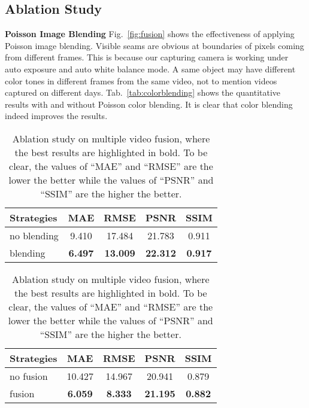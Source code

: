 \documentclass[runningheads]{llncs}
\begin{document}
\subsection{Ablation Study}

\textbf{Poisson Image Blending} Fig.~\ref{fig:fusion} shows the effectiveness of applying Poisson image blending. Visible seams are obvious at boundaries of pixels coming from different frames. This is because our capturing camera is working under auto exposure and auto white balance mode. A same object may have different color tones in different frames from the same video, not to mention videos captured on different days. Tab.~\ref{tab:colorblending} shows the quantitative results with and without Poisson color blending. It is clear that color blending indeed improves the results.

\begin{table}[]
\begin{minipage}[t]{.48\textwidth}
\centering
{
\begin{tabular}{ l c c c c }
\hline
  Strategies   & MAE     & RMSE            & PSNR            & SSIM            \\ \hline
no blending     & 9.410          & 17.484          & 21.783          & 0.911          \\  
blending        &  \textbf{6.497}        &  \textbf{13.009}          &  \textbf{22.312}          &  \textbf{0.917}         \\ \hline
\end{tabular}
\caption{Ablation study on Poisson color blending, where the best results are highlighted in bold. To be clear, the values of ``MAE'' and ``RMSE'' are the lower the better while the values of ``PSNR'' and ``SSIM'' are the higher the better.}
\label{tab:colorblending}
}
\end{minipage}\hspace{0.4cm}\begin{minipage}[t]{.48\textwidth}

\centering
{
\begin{tabular}{ l c c c c }
\hline
 Strategies & MAE             & RMSE            & PSNR            & SSIM            \\ \hline
no fusion           & 10.427          & 14.967          & 20.941          & 0.879          \\  
fusion              & \textbf{6.059}          &  \textbf{8.333}          &  \textbf{21.195}          &  \textbf{0.882}          \\ \hline
\end{tabular}
\caption{Ablation study on multiple video fusion, where the best results are highlighted in bold. To be clear, the values of ``MAE'' and ``RMSE'' are the lower the better while the values of ``PSNR'' and ``SSIM'' are the higher the better.}
\label{tab:fusion}
}
\end{minipage}
\end{table}
\end{document}
